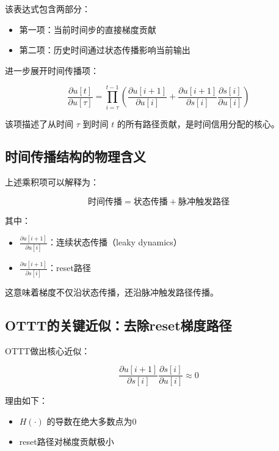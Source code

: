 \documentclass[journal,12pt,onecolumn]{IEEEtran}
\begin{document}
该表达式包含两部分：

\begin{itemize}
\item 第一项：当前时间步的直接梯度贡献
\item 第二项：历史时间通过状态传播影响当前输出
\end{itemize}

进一步展开时间传播项：

\begin{equation}
\frac{\partial u[t]}{\partial u[\tau]} =
\prod_{i=\tau}^{t-1}
\left(
\frac{\partial u[i+1]}{\partial u[i]}
+
\frac{\partial u[i+1]}{\partial s[i]}
\frac{\partial s[i]}{\partial u[i]}
\right)
\end{equation}

该项描述了从时间 $\tau$ 到时间 $t$ 的所有路径贡献，是时间信用分配的核心。



\subsection{时间传播结构的物理含义}

上述乘积项可以解释为：

\begin{equation}
\text{时间传播} =
\text{状态传播} + \text{脉冲触发路径}
\end{equation}

其中：

\begin{itemize}
\item $\frac{\partial u[i+1]}{\partial u[i]}$：连续状态传播（leaky dynamics）
\item $\frac{\partial u[i+1]}{\partial s[i]}$：reset路径
\end{itemize}

这意味着梯度不仅沿状态传播，还沿脉冲触发路径传播。



\subsection{OTTT的关键近似：去除reset梯度路径}

OTTT做出核心近似：

\begin{equation}
\frac{\partial u[i+1]}{\partial s[i]}
\frac{\partial s[i]}{\partial u[i]} \approx 0
\end{equation}

理由如下：

\begin{itemize}
\item $H(\cdot)$ 的导数在绝大多数点为0
\item reset路径对梯度贡献极小
\end{itemize}
\end{document}
